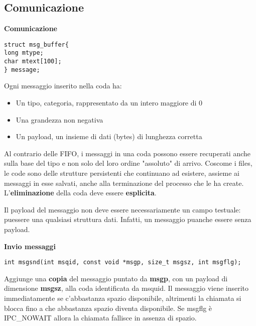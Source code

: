 \begin{flushleft}
  \subsection{Comunicazione}
  \begin{flushleft}
    \textbf{Comunicazione}\par 
    \begin{flushleft}
      \texttt{struct msg\_buffer\{\\
        \halftab long mtype;\\
        \halftab char mtext[100];\\
        \} message;}
    \end{flushleft}
    Ogni messaggio inserito nella coda ha:
    \begin{itemize}
      \item Un tipo, categoria, rappresentato da un intero maggiore di 0
      \item Una grandezza non negativa
      \item Un payload, un insieme di dati (bytes) di lunghezza corretta
    \end{itemize}
    Al contrario delle FIFO, i messaggi in una coda possono essere recuperati anche 
    sulla base del tipo e non solo del loro ordine "assoluto" di arrivo. Cos\aci come i files, le 
    code sono delle strutture persistenti che continuano ad esistere, assieme ai messaggi 
    in esse salvati, anche alla terminazione del processo che le ha create. L'\textbf{eliminazione} 
    della coda deve essere \textbf{esplicita}.\par 
    Il payload del messaggio non deve essere necessariamente un campo 
    testuale: pu\aco essere una qualsiasi struttura dati. Infatti, un 
    messaggio pu\aco anche essere senza payload.
  \end{flushleft}
  \tab
  \begin{flushleft}
    \textbf{Invio messaggi}\par 
    \begin{flushleft}
      \texttt{int msgsnd(int msqid, const void *msgp, size\_t msgsz, int msgflg);}
    \end{flushleft}
    Aggiunge una \textbf{copia} del messaggio puntato da \textbf{msgp}, con un payload di dimensione 
    \textbf{msgsz}, alla coda identificata da msquid. Il messaggio viene inserito 
    immediatamente se c'\ace abbastanza spazio disponibile, altrimenti la chiamata si blocca 
    fino a che abbastanza spazio diventa disponibile. Se msgflg è IPC\_NOWAIT allora 
    la chiamata fallisce in assenza di spazio. \\

\end{flushleft}
\end{flushleft}
